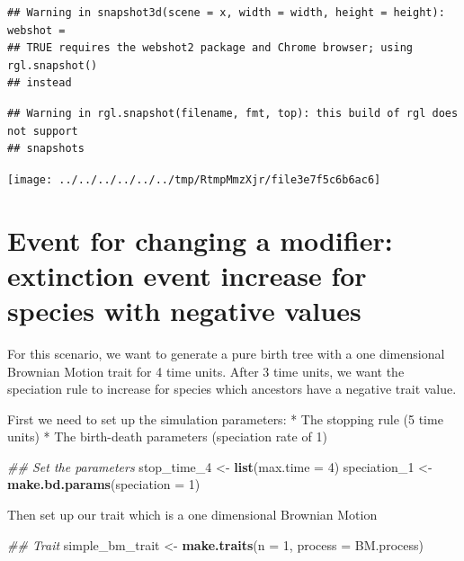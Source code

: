 \documentclass[
]{book}
\newenvironment{Shaded}{\begin{snugshade}}{\end{snugshade}}
\newcommand{\CommentTok}[1]{\textcolor[rgb]{0.56,0.35,0.01}{\textit{#1}}}
\newcommand{\DataTypeTok}[1]{\textcolor[rgb]{0.13,0.29,0.53}{#1}}
\newcommand{\DecValTok}[1]{\textcolor[rgb]{0.00,0.00,0.81}{#1}}
\newcommand{\KeywordTok}[1]{\textcolor[rgb]{0.13,0.29,0.53}{\textbf{#1}}}
\newcommand{\NormalTok}[1]{#1}
\newcommand{\StringTok}[1]{\textcolor[rgb]{0.31,0.60,0.02}{#1}}
\begin{document}
\begin{verbatim}
## Warning in snapshot3d(scene = x, width = width, height = height): webshot =
## TRUE requires the webshot2 package and Chrome browser; using rgl.snapshot()
## instead
\end{verbatim}

\begin{verbatim}
## Warning in rgl.snapshot(filename, fmt, top): this build of rgl does not support
## snapshots
\end{verbatim}

\texttt{[image: ../../../../../../tmp/RtmpMmzXjr/file3e7f5c6b6ac6]}

\hypertarget{EG_change_modif}{%
\section{Event for changing a modifier: extinction event increase for species with negative values}\label{EG_change_modif}}

For this scenario, we want to generate a pure birth tree with a one dimensional Brownian Motion trait for 4 time units.
After 3 time units, we want the speciation rule to increase for species which ancestors have a negative trait value.

First we need to set up the simulation parameters:
* The stopping rule (5 time units)
* The birth-death parameters (speciation rate of 1)

\begin{Shaded}
\begin{Highlighting}[]
\CommentTok{\#\# Set the parameters}
\NormalTok{stop\_time\_}\DecValTok{4}\NormalTok{ \textless{}{-}}\StringTok{ }\KeywordTok{list}\NormalTok{(}\DataTypeTok{max.time =} \DecValTok{4}\NormalTok{)}
\NormalTok{speciation\_}\DecValTok{1}\NormalTok{ \textless{}{-}}\StringTok{ }\KeywordTok{make.bd.params}\NormalTok{(}\DataTypeTok{speciation =} \DecValTok{1}\NormalTok{)}
\end{Highlighting}
\end{Shaded}

Then set up our trait which is a one dimensional Brownian Motion

\begin{Shaded}
\begin{Highlighting}[]
\CommentTok{\#\# Trait}
\NormalTok{simple\_bm\_trait \textless{}{-}}\StringTok{ }\KeywordTok{make.traits}\NormalTok{(}\DataTypeTok{n =} \DecValTok{1}\NormalTok{, }\DataTypeTok{process =}\NormalTok{ BM.process)}
\end{Highlighting}
\end{Shaded}
\end{document}
